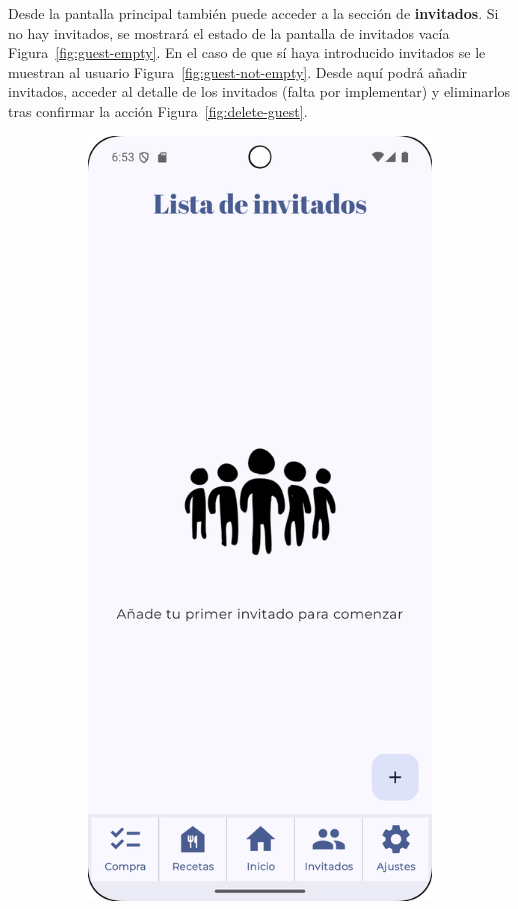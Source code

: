 \clearpage
Desde la pantalla principal también puede acceder a la sección de \textbf{invitados}. Si no hay invitados, se mostrará el estado de la pantalla de invitados vacía Figura~\ref{fig:guest-empty}. En el caso de que sí haya introducido invitados se le muestran al usuario Figura~\ref{fig:guest-not-empty}. Desde aquí podrá añadir invitados, acceder al detalle de los invitados (falta por implementar) y eliminarlos tras confirmar la acción Figura~\ref{fig:delete-guest}.

\begin{figure}[H]
    \centering

    \begin{subfigure}[b]{0.3\textwidth}
      \includegraphics[width=\textwidth]{./img/manual/empty_guests.png}

\end{subfigure}
\end{figure}
